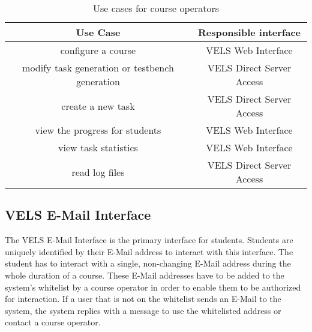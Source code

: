 \begin{table}[h]
\centering
\begin{tabular}{||c | c||} 
    \hline
    Use Case & Responsible interface \\ [0.5ex] 
     \hline\hline
    configure a course & VELS Web Interface
    \\
    \hline
    modify task generation or testbench generation & VELS Direct Server Access
    \\
    \hline
    create a new task & VELS Direct Server Access
    \\
    \hline
    view the progress for students & VELS Web Interface
    \\
    \hline
    view task statistics & VELS Web Interface
    \\
    \hline
    read log files & VELS Direct Server Access 
    \\
    \hline
\end{tabular}
\caption{Use cases for course operators}
\label{tab:useoperator}
\end{table}

\newpage

\subsection{VELS E-Mail Interface}\label{emailinterface}
The VELS E-Mail Interface is the primary interface for students. Students are uniquely 
identified by their E-Mail address to interact with this interface. The student has to 
interact with a single, non-changing E-Mail address during the whole duration of a course. 
These E-Mail addresses have to be added to the system's whitelist by a course operator 
in order to enable them to be authorized for interaction. If a user that is not on the 
whitelist sends an E-Mail to the system, the system replies with a message to use the 
whitelisted address or contact a course operator.

